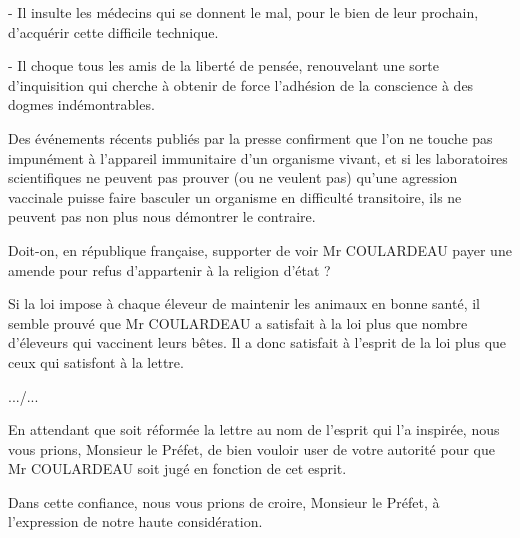 - Il insulte les médecins qui se donnent le mal, pour le bien de leur prochain, d'acquérir cette difficile technique.

- Il choque tous les amis de la liberté de pensée, renouvelant une sorte d'inquisition qui cherche à obtenir de force l'adhésion de la conscience à des dogmes indémontrables.

Des événements récents publiés par la presse confirment que l'on ne touche pas impunément à l'appareil immunitaire d'un organisme vivant, et si les laboratoires scientifiques ne peuvent pas prouver (ou ne veulent pas) qu'une agression vaccinale puisse faire basculer un organisme en difficulté transitoire, ils ne peuvent pas non plus nous démontrer le contraire.

Doit-on, en république française, supporter de voir Mr COULARDEAU payer une amende pour refus d'appartenir à la religion d'état ?

Si la loi impose à chaque éleveur de maintenir les animaux en bonne santé, il semble prouvé que Mr COULARDEAU a satisfait à la loi plus que nombre d'éleveurs qui vaccinent leurs bêtes. Il a donc satisfait à l'esprit de la loi plus que ceux qui satisfont à la lettre.

\hfill .../...

En attendant que soit réformée la lettre au nom de l'esprit qui l'a inspirée, nous vous prions, Monsieur le Préfet, de bien vouloir user de votre autorité pour que Mr COULARDEAU soit jugé en fonction de cet esprit.

Dans cette confiance, nous vous prions de croire, Monsieur le Préfet, à l'expression de notre haute considération.\\

\\

\\

\\

\\

